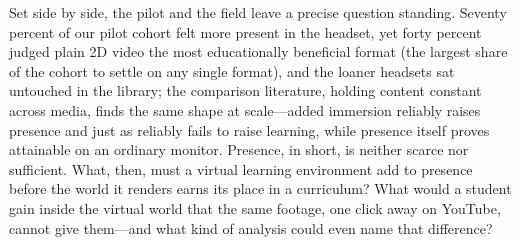 
Set side by side, the pilot and the field leave a precise question standing.
Seventy percent of our pilot cohort felt more present in the headset, yet forty
percent judged plain 2D video the most educationally beneficial format (the
largest share of the cohort to settle on any single format), and the loaner
headsets sat untouched in the library; the comparison literature, holding
content constant across media, finds the same shape at scale---added immersion
reliably raises presence and just as reliably fails to raise learning, while
presence itself proves attainable on an ordinary monitor. Presence, in short, is
neither scarce nor sufficient. What, then, must a virtual learning environment
add to presence before the world it renders earns its place in a curriculum?
What would a student gain inside the virtual world that the same footage, one
click away on YouTube, cannot give them---and what kind of analysis could even
name that difference?


